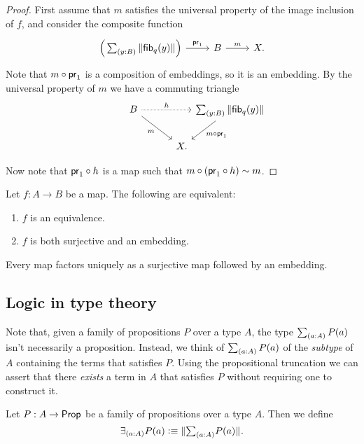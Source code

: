 \begin{proof}
  First assume that $m$ satisfies the universal property of the image inclusion of $f$, and consider the composite function
  \begin{equation*}
    \begin{tikzcd}
      \Big(\sm{y:B}\brck{\fib{q}{y}}\Big) \arrow[r,"\proj 1"] & B \arrow[r,"m"] & X.
    \end{tikzcd}
  \end{equation*}
  Note that $m\circ\mathsf{pr}_{1}$ is a composition of embeddings, so it is an embedding. By the universal property of $m$ we have a commuting triangle
  \begin{equation*}
    \begin{tikzcd}[column sep=0]
      B \arrow[dr,swap,"m"] \arrow[rr,densely dotted,"h"] & & \sm{y:B}\brck{\fib{q}{y}} \arrow[dl,"m\circ\proj 1"] \\
      \phantom{\sm{y:B}\brck{\fib{q}{y}}} & X.
    \end{tikzcd}
  \end{equation*}
  Now note that $\mathsf{pr}_{1}\circ h$ is a map such that $m\circ (\mathsf{pr}_{1}\circ h)\sim m$. 
\end{proof}

\begin{thm}
Let $f:A\to B$ be a map. The following are equivalent:
\begin{enumerate}
\item $f$ is an equivalence.
\item $f$ is both surjective and an embedding.
\end{enumerate}
\end{thm}

\begin{thm}
  Every map factors uniquely as a surjective map followed by an embedding.
\end{thm}

\subsection{Logic in type theory}
Note that, given a family of propositions $P$ over a type $A$, the type $\sm{a:A}P(a)$ isn't necessarily a proposition. Instead, we think of $\sm{a:A}P(a)$ of the \emph{subtype} of $A$ containing the terms that satisfies $P$. Using the propositional truncation we can assert that there \emph{exists} a term in $A$ that satisfies $P$ without requiring one to construct it. 

\begin{defn}
Let $P:A\to \mathsf{Prop}$ be a family of propositions over a type $A$. Then we define
\begin{equation*}
\exists_{(a:A)}P(a)\defeq \brck{\sm{a:A}P(a)}.
\end{equation*}
\end{defn}

